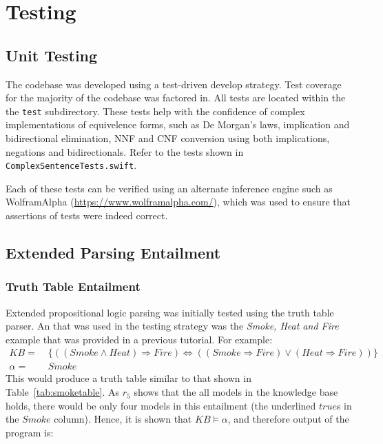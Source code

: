 \section{Testing}
\label{sec:Testing}

\subsection{Unit Testing}
\label{sub:Unit Testing}

The codebase was developed using a test-driven develop strategy. Test coverage
for the majority of the codebase was factored in. All tests are located within
the the \texttt{test} subdirectory. These tests help with the confidence of
complex implementations of equivelence forms, such as De Morgan's laws, implication
and bidirectional elimination, NNF and CNF conversion using both implications, negations
and bidirectionals. Refer to the tests shown in \texttt{ComplexSentenceTests.swift}.

Each of these tests can be verified using an alternate inference engine such as
WolframAlpha (\url{https://www.wolframalpha.com/}), which was used to ensure
that assertions of tests were indeed correct.

\subsection{Extended Parsing Entailment}
\label{sub:Extended Parsing Entailment}

\subsubsection{Truth Table Entailment}
\label{subs:Truth Table Entailment}

Extended propositional logic parsing was initially tested using the truth
table parser. An that was used in the testing strategy was the \emph{Smoke, Heat and Fire}
example that was provided in a previous tutorial. For example:
\begin{align*}
  KB     =& \; \{ ((Smoke \wedge Heat) \Rightarrow Fire) \Leftrightarrow ((Smoke \Rightarrow Fire) \vee (Heat \Rightarrow Fire)) \}\\
  \alpha =& \; Smoke
\end{align*}
This would produce a truth table similar to that shown in Table~\ref{tab:smoketable}.
As $r_{5}$ shows that the all models in the knowledge base holds, there would be
only four models in this entailment (the underlined $true$s in the $Smoke$ column).
Hence, it is shown that $KB \models \alpha$, and therefore output of the program is:

